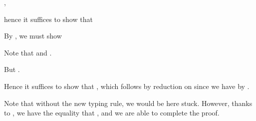     \im{\cpstyjudg{\slenv^+}{\seone^\div}{\cpspity{\cpsalpha}{\cpsstarty}{\cpsfunty{(\cpsfunty{(\cpspity{\cpsx}{\sA^+}{\sB^\div})}{\cpsalpha})}{\cpsalpha}}}},

    hence it suffices to show that

    \im{\cpstyjudg{\slenv^+,\begin{stackTL}\cpsalpha:\cpsstarty,
        \\\cpsk:\cpsfunty{(\subst{\sB^{+}}{(\cpsncappe{\setwo^\div}{\sA^+}{\cpsidk})}{\cpsx})}
        {\cpsalpha},
        \\
        \cpsf:\cpspity{\cpsx}{\sA^+}{\sB^{\div}}
        \end{stackTL}
      }{
        \cpscappe{\setwo^\div}{\cpsalpha}{(\cpsfune{\cpsx}{\sA^{+}}{
            \cpsncappe{(\cpsappe{\cpsf}{\cpsx})}{\cpsalpha}{\cpsk}})}}{\cpsalpha}}

    By , we must show

    \im{\cpstyjudg{\slenv^+,\begin{stackTL}\cpsalpha:\cpsstarty,
        \\\cpsk:\cpsfunty{(\subst{\sB^{+}}{(\cpsncappe{\setwo^\div}{\sA^+}{\cpsidk})}{\cpsx})}
        {\cpsalpha},
        \\\cpsf:\cpspity{\cpsx}{\sA^+}{\sB^{\div}},
        \\\cpsx = \cpsncappe{\setwo^\div}{\sA^+}{\cpsidk},
        \end{stackTL}
      }{\cpsncappe{(\cpsappe{\cpsf}{\cpsx})}{\cpsalpha}{\cpsk}}{\cpsalpha}}

    Note that \im{\cpsappe{\cpsf}{\cpsx} : \subst{\sB^\div}{\cpsx}{\cpsx}} and
    \im{\subst{\sB^\div}{\cpsx}{\cpsx} =
      \cpspity{\cpsalpha}{\cpsstarty}{\cpsfunty{\cpsfunty{(\subst{\sB^+}{\cpsx}{\cpsx})}{\cpsalpha}}{\cpsalpha}}}.

    But \im{\cpsk : \cpsfunty{(\subst{\sB^{+}}{(\cpsncappe{\setwo^\div}{\sA^+}{\cpsidk})}{\cpsx})}{\cpsalpha}}.

    Hence it suffices to show that \im{(\subst{\sB^+}{\cpsx}{\cpsx}) \equiv
      (\subst{\sB^{+}}{(\cpsncappe{\setwo^\div}{\sA^+}{\cpsidk})}{\cpsx})}, which follows by
    \im{\delta} reduction on \im{\cpsx} since we have \im{\cpsx =
      \cpsncappe{\setwo^\div}{\sA^+}{\cpsidk}} by .

    Note that without the new typing rule, we would be here stuck.
    However, thanks to , we have the equality that \im{\cpsx =
      \cpsncappe{\setwo^\div}{\sA^+}{\cpsidk}}, and we are able to complete the
    proof.

